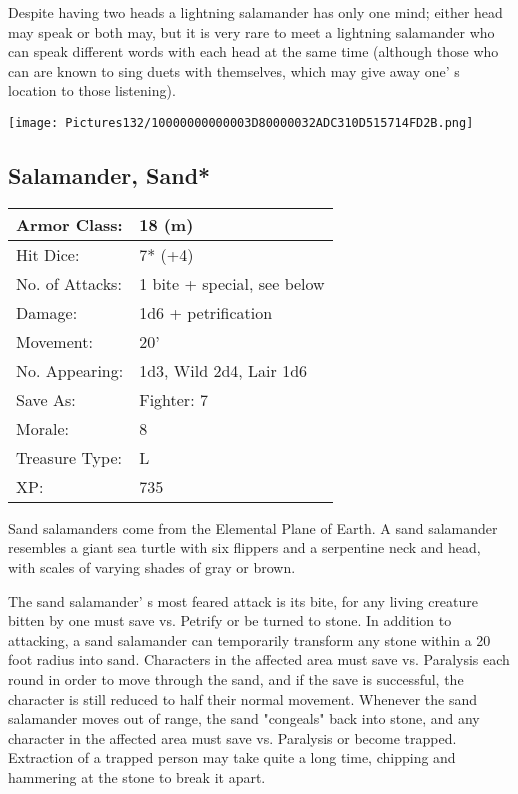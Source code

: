 \documentclass[a4paper,twoside,openany,10pt]{book}
\begin{document}
\begin{multicols}{2}
Despite having two heads a lightning salamander has only one mind; either head may speak or both may, but it is very rare to meet a lightning salamander who can speak different words with each head at the same time (although those who can are known to sing duets with themselves, which may give away one' s location to those listening).

\vfill

\begin{center} \texttt{[image: Pictures132/10000000000003D80000032ADC310D515714FD2B.png]} \end{center}


\subsection*{Salamander, Sand*}\label{salamander-sand}

\begin{tabularx}{0.50\textwidth}{@{}lX@{}}
Armor Class: & 18 (m) \\\hline
Hit Dice: & 7* (+4) \\\hline
No. of Attacks: & 1 bite + special, see below \\\hline
Damage: & 1d6 + petrification \\\hline
Movement: & 20' \\\hline
No. Appearing: & 1d3, Wild 2d4, Lair 1d6 \\\hline
Save As: & Fighter: 7 \\\hline
Morale: & 8 \\\hline
Treasure Type: & L \\\hline
XP: & 735 \\\hline
\end{tabularx}

Sand salamanders come from the Elemental Plane of Earth. A sand salamander resembles a giant sea turtle with six flippers and a serpentine neck and head, with scales of varying shades of gray or brown.

The sand salamander' s most feared attack is its bite, for any living creature bitten by one must save vs. Petrify or be turned to stone. In addition to attacking, a sand salamander can temporarily transform any stone within a 20 foot radius into sand. Characters in the affected area must save vs. Paralysis each round in order to move through the sand, and if the save is successful, the character is still reduced to half their normal movement. Whenever the sand salamander moves out of range, the sand "congeals" back into stone, and any character in the affected area must save vs. Paralysis or become trapped. Extraction of a trapped person may take quite a long time, chipping and hammering at the stone to break it apart.


\end{multicols}
\end{document}
